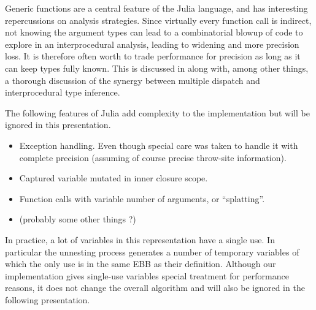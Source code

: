 \documentclass[11pt]{article}
\begin{document}
Generic functions are a central feature of the Julia language, and has interesting repercussions on analysis strategies. Since virtually every function call is indirect, not knowing the argument types can lead to a combinatorial blowup of code to explore in an interprocedural analysis, leading to widening and more precision loss. It is therefore often worth to trade performance for precision as long as it can keep types fully known. This is discussed in \cite{jeff-phd} along with, among other things, a thorough discussion of the synergy between multiple dispatch and interprocedural type inference. 

The following features of Julia add complexity to the implementation but will be ignored in this presentation.
\begin{itemize}
\item Exception handling. Even though special care was taken to handle it with complete precision (assuming of course precise throw-site information).
\item Captured variable mutated in inner closure scope.
\item Function calls with variable number of arguments, or ``splatting''.
\item (probably some other things ?)
\end{itemize}

In practice, a lot of variables in this representation have a single use. 
In particular the unnesting process generates a number of temporary variables of which the only use is in the same EBB as their definition. 
Although our implementation gives single-use variables special treatment for performance reasons, it does not change the overall algorithm and will also be ignored
in the following presentation. 
\end{document}
